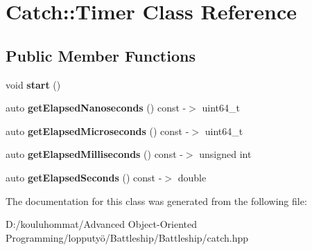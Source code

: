 \hypertarget{class_catch_1_1_timer}{}\section{Catch\+:\+:Timer Class Reference}
\label{class_catch_1_1_timer}
\subsection*{Public Member Functions}
\begin{DoxyCompactItemize}
\item 
\mbox{\label{class_catch_1_1_timer_a0a56e879e43f36c102bf9ea8b5fc8b72}} 
void {\bfseries start} ()
\item 
\mbox{\label{class_catch_1_1_timer_a57be5d17ca868a2d6fb1eea84de665cf}} 
auto {\bfseries get\+Elapsed\+Nanoseconds} () const -\/$>$ uint64\+\_\+t
\item 
\mbox{\label{class_catch_1_1_timer_a545de17a61a6fee1dbe3de5b0723e5fa}} 
auto {\bfseries get\+Elapsed\+Microseconds} () const -\/$>$ uint64\+\_\+t
\item 
\mbox{\label{class_catch_1_1_timer_a30aaf458dbb59dd8ac8971c9c62e0eac}} 
auto {\bfseries get\+Elapsed\+Milliseconds} () const -\/$>$ unsigned int
\item 
\mbox{\label{class_catch_1_1_timer_a065e37e3c9eb16bd4dcf41971d8deedc}} 
auto {\bfseries get\+Elapsed\+Seconds} () const -\/$>$ double
\end{DoxyCompactItemize}


The documentation for this class was generated from the following file\+:\begin{DoxyCompactItemize}
\item 
D\+:/kouluhommat/\+Advanced Object-\/\+Oriented Programming/lopputyö/\+Battleship/\+Battleship/catch.\+hpp\end{DoxyCompactItemize}
